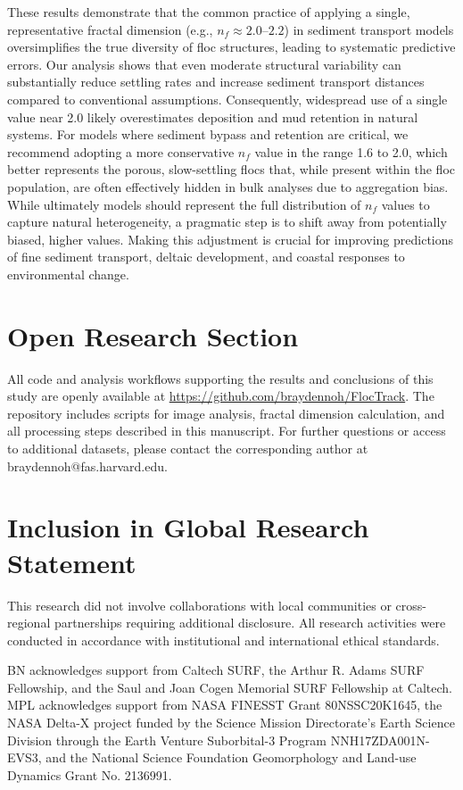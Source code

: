 \documentclass{agujournal2019}
\begin{document}
These results demonstrate that the common practice of applying a single, representative fractal dimension (e.g., \( n_f \approx 2.0\text{--}2.2 \)) in sediment transport models oversimplifies the true diversity of floc structures, leading to systematic predictive errors. Our analysis shows that even moderate structural variability can substantially reduce settling rates and increase sediment transport distances compared to conventional assumptions. Consequently, widespread use of a single value near 2.0 likely overestimates deposition and mud retention in natural systems. For models where sediment bypass and retention are critical, we recommend adopting a more conservative \( n_f \) value in the range 1.6 to 2.0, which better represents the porous, slow-settling flocs that, while present within the floc population, are often effectively hidden in bulk analyses due to aggregation bias. While ultimately models should represent the full distribution of \( n_f \) values to capture natural heterogeneity, a pragmatic step is to shift away from potentially biased, higher values. Making this adjustment is crucial for improving predictions of fine sediment transport, deltaic development, and coastal responses to environmental change.

\section*{Open Research Section}
All code and analysis workflows supporting the results and conclusions of this study are openly available at \url{https://github.com/braydennoh/FlocTrack}. The repository includes scripts for image analysis, fractal dimension calculation, and all processing steps described in this manuscript. For further questions or access to additional datasets, please contact the corresponding author at braydennoh@fas.harvard.edu.

\section*{Inclusion in Global Research Statement}
This research did not involve collaborations with local communities or cross-regional partnerships requiring additional disclosure. All research activities were conducted in accordance with institutional and international ethical standards.

\acknowledgments
BN acknowledges support from Caltech SURF, the Arthur R. Adams SURF Fellowship, and the Saul and Joan Cogen Memorial SURF Fellowship at Caltech. MPL acknowledges support from NASA FINESST Grant 80NSSC20K1645, the NASA Delta-X project funded by the Science Mission Directorate's Earth Science Division through the Earth Venture Suborbital-3 Program NNH17ZDA001N-EVS3, and the National Science Foundation Geomorphology and Land-use Dynamics Grant No. 2136991.
\end{document}

